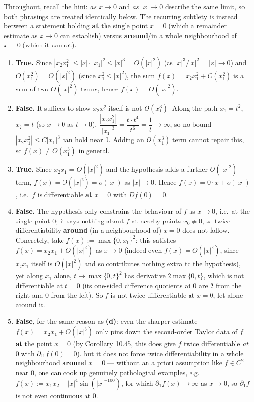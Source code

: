 \begin{exercisesolution}
Throughout, recall the hint: \textit{as $x \to 0$} and \textit{as $|x| \to 0$} describe the same
limit, so both phrasings are treated identically below. The recurring subtlety is instead between
a statement holding \textbf{at} the single point $x=0$ (which a remainder estimate as $x \to 0$
can establish) versus \textbf{around}/in a whole neighbourhood of $x=0$ (which it cannot).
\begin{enumerate}[label=\textbf{(\alph*)}]
  \item \textbf{True.} Since $|x_2x_1^2| \leq |x|\cdot|x_1|^2 \leq |x|^3 = O(|x|^2)$ (as
    $|x|^3/|x|^2 = |x| \to 0$) and $O(x_1^2) = O(|x|^2)$ (since $x_1^2 \leq |x|^2$), the sum
    $f(x) = x_2x_1^2 + O(x_1^2)$ is a sum of two $O(|x|^2)$ terms, hence $f(x) = O(|x|^2)$.
  \item \textbf{False.} It suffices to show $x_2x_1^2$ itself is not $O(x_1^3)$. Along the path
    $x_1 = t^2$, $x_2 = t$ (so $x \to 0$ as $t \to 0$), $\dfrac{|x_2x_1^2|}{|x_1|^3} =
    \dfrac{t\cdot t^4}{t^6} = \dfrac{1}{t} \to \infty$, so no bound $|x_2x_1^2| \leq C|x_1|^3$ can
    hold near $0$. Adding an $O(x_1^3)$ term cannot repair this, so $f(x) \neq O(x_1^3)$ in
    general.
  \item \textbf{True.} Since $x_2x_1 = O(|x|^2)$ and the hypothesis adds a further $O(|x|^2)$
    term, $f(x) = O(|x|^2) = o(|x|)$ as $|x| \to 0$. Hence $f(x) = 0\cdot x + o(|x|)$, i.e.\ $f$ is
    differentiable \textbf{at} $x=0$ with $Df(0) = 0$.
  \item \textbf{False.} The hypothesis only constrains the behaviour of $f$ as $x \to 0$, i.e.\ at
    the single point $0$; it says nothing about $f$ at nearby points $x_0 \neq 0$, so twice
    differentiability \textbf{around} (in a neighbourhood of) $x=0$ does not follow. Concretely,
    take $f(x) := \max\{0,x_1\}^2$: this satisfies $f(x) = x_2x_1 + O(|x|^2)$ as $x \to 0$ (indeed
    even $f(x) = O(|x|^2)$, since $x_2x_1$ itself is $O(|x|^2)$ and so contributes nothing extra
    to the hypothesis), yet along $x_1$ alone, $t \mapsto \max\{0,t\}^2$ has derivative $2\max\{0,t\}$,
    which is not differentiable at $t=0$ (its one-sided difference quotients at $0$ are $2$ from
    the right and $0$ from the left). So $f$ is not twice differentiable at $x=0$, let alone
    around it.
  \item \textbf{False}, for the same reason as \textbf{(d)}: even the sharper estimate
    $f(x) = x_2x_1 + O(|x|^3)$ only pins down the second-order Taylor data of $f$ \textbf{at} the
    point $x=0$ (by Corollary 10.45, this does give $f$ twice differentiable \emph{at} $0$ with
    $\partial_{11}f(0) = 0$), but it does not force twice differentiability in a whole
    neighbourhood \textbf{around} $x=0$ --- without an a priori assumption like $f \in C^2$ near
    $0$, one can cook up genuinely pathological examples, e.g.\
    $f(x) := x_1x_2 + |x|^4\sin(|x|^{-100})$, for which $\partial_1 f(x) \to \infty$ as
    $x \to 0$, so $\partial_1 f$ is not even continuous at $0$.
\end{enumerate}
\end{exercisesolution}

